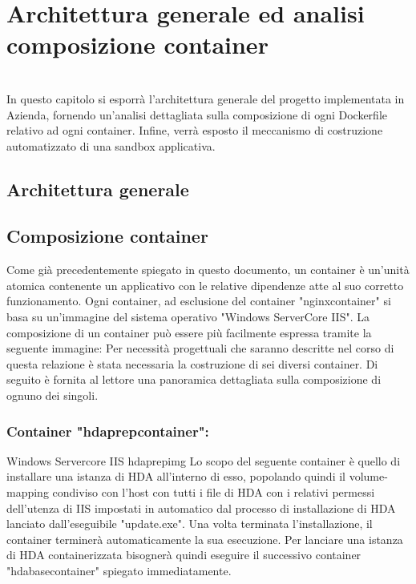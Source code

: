 
\chapter{Architettura generale ed analisi composizione container}
\label{cap:analisi-progetto-container}

\\
In questo capitolo si esporrà l'architettura generale del progetto implementata in Azienda, fornendo un'analisi dettagliata sulla composizione di ogni Dockerfile relativo ad ogni container. Infine, verrà esposto il meccanismo di costruzione automatizzato di una sandbox applicativa.

\section{Architettura generale}

\section{Composizione container}
Come già precedentemente spiegato in questo documento, un container è un'unità atomica contenente un applicativo con le relative dipendenze atte al suo corretto funzionamento. Ogni container, ad esclusione del container "nginxcontainer" si basa su un'immagine del sistema operativo "Windows ServerCore IIS".
La composizione di un container può essere più facilmente espressa tramite la seguente immagine:
Per necessità progettuali che saranno descritte nel corso di questa relazione è stata necessaria la costruzione di sei diversi container. Di seguito è fornita al lettore una panoramica dettagliata sulla composizione di ognuno dei singoli.\\

\subsection{Container "hdaprepcontainer":}

\begin{namespacedesc}
	 {Windows Servercore IIS}
	 {hdaprepimg}
	 {Lo scopo del seguente container è quello di installare una istanza di HDA all'interno di esso, popolando quindi il volume-mapping condiviso con l'host con tutti i file di HDA con i relativi permessi dell'utenza di IIS impostati in automatico dal processo di installazione di HDA lanciato dall'eseguibile "update.exe".
Una volta terminata l'installazione, il container terminerà automaticamente la sua esecuzione. Per lanciare una istanza di HDA containerizzata bisognerà quindi eseguire il successivo container "hdabasecontainer" spiegato immediatamente.}
\end{namespacedesc}
